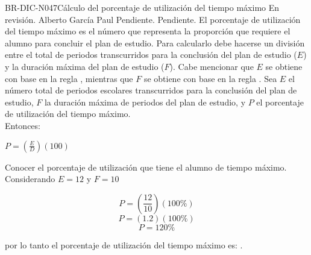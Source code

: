\begin{BusinessRule}{BR-DIC-N047}{Cálculo del porcentaje de utilización del tiempo máximo}
	{\bcCondition} %
	{\btTimer}     %
	{\blInfluencing}     %
	\BRItem[Estado] En revisión.
	  Alberto García Paul
	 Pendiente.
	 Pendiente.
	\BRItem[Descripción] El porcentaje de utilización del tiempo máximo es el número que representa la proporción que requiere el alumno para concluir el plan de estudio. Para calcularlo debe hacerse un división entre el total de periodos transcurridos para la conclusión del plan de estudio ($E$) y la duración máxima del plan de estudio ($F$). Cabe mencionar que $E$ se obtiene con base en la regla , mientras que $F$ se obtiene con base en la regla .
	\BRItem[Sentencia] \cdtEmpty
	Sea $E$ el número total de periodos escolares transcurridos para la conclusión del plan de estudio, $F$ la duración máxima de periodos del plan de estudio, y $P$ el porcentaje de utilización del tiempo máximo. \\
	Entonces:
	\begin{center}
		$P = (\frac{E}{D})(100)$
	\end{center} 
	\BRItem[Motivación] Conocer el porcentaje de utilización que tiene el alumno de tiempo máximo.
	\BRItem[Ejemplo 1] \cdtEmpty
	Considerando $E = 12$ y $F = 10$
	
	\begin{center}
			\[P = (\frac{12}{10})(100\%)\] 
			\[P = (1.2)(100\%)\] 
			\[P = 120\%\]
	\end{center}
	por lo tanto el porcentaje de utilización del tiempo máximo es: . 
\end{BusinessRule}

